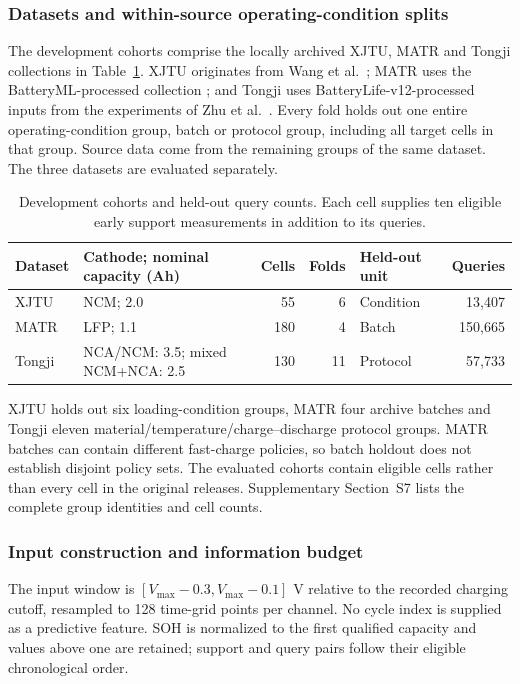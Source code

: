 \documentclass[preprint,12pt]{elsarticle}
\begin{document}
\subsubsection{Datasets and within-source operating-condition splits}
The development cohorts comprise the locally archived XJTU, MATR and Tongji collections in Table~\ref{tab:datasets}. XJTU originates from Wang et al.\ \citep{wang2024}; MATR uses the BatteryML-processed collection \citep{batteryml2024,severson2019}; and Tongji uses BatteryLife-v12-processed inputs from the experiments of Zhu et al.\ \citep{batterylife2025,zhu2022}. Every fold holds out one entire operating-condition group, batch or protocol group, including all target cells in that group. Source data come from the remaining groups of the same dataset. The three datasets are evaluated separately.
\begin{table}[!htbp]\centering
\caption{Development cohorts and held-out query counts. Each cell supplies ten eligible early support measurements in addition to its queries.}\label{tab:datasets}
\papertablesize\setlength{\tabcolsep}{4pt}\begin{tabular}{lp{}rrlr}\toprule
Dataset & Cathode; nominal capacity (Ah) & Cells & Folds & Held-out unit & Queries\\\midrule
XJTU & NCM; 2.0 & 55 & 6 & Condition & 13,407\\
MATR & LFP; 1.1 & 180 & 4 & Batch & 150,665\\
Tongji & NCA/NCM: 3.5; mixed NCM+NCA: 2.5 & 130 & 11 & Protocol & 57,733\\\bottomrule
\end{tabular}\end{table}
XJTU holds out six loading-condition groups, MATR four archive batches and Tongji eleven material/temperature/charge--discharge protocol groups. MATR batches can contain different fast-charge policies, so batch holdout does not establish disjoint policy sets. The evaluated cohorts contain eligible cells rather than every cell in the original releases. Supplementary Section~S7 lists the complete group identities and cell counts.

\subsubsection{Input construction and information budget}
The input window is $[V_{\max}-0.3,V_{\max}-0.1]$ V relative to the recorded charging cutoff, resampled to 128 time-grid points per channel. No cycle index is supplied as a predictive feature. SOH is normalized to the first qualified capacity and values above one are retained; support and query pairs follow their eligible chronological order.
\end{document}

